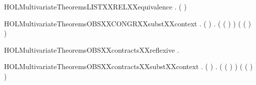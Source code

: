 \newcommand{\HOLMultivariateTheoremsFVXXSUBSETXXBIGUNIONXXPRO}{\UseVerbatim{HOLMultivariateTheoremsFVXXSUBSETXXBIGUNIONXXPRO}}
\begin{SaveVerbatim}{HOLMultivariateTheoremsLISTXXRELXXequivalence}
\HOLTokenTurnstile{} \HOLSymConst{\HOLTokenForall{}}.   \HOLSymConst{\HOLTokenImp{}}  ( )
\end{SaveVerbatim}
\newcommand{\HOLMultivariateTheoremsLISTXXRELXXequivalence}{\UseVerbatim{HOLMultivariateTheoremsLISTXXRELXXequivalence}}
\begin{SaveVerbatim}{HOLMultivariateTheoremsOBSXXCONGRXXsubstXXcontext}
\HOLTokenTurnstile{} \HOLSymConst{\HOLTokenForall{}}  .
         \HOLSymConst{\HOLTokenConj{}} (  \HOLSymConst{=}  ) \HOLSymConst{\HOLTokenConj{}}
          \HOLSymConst{\HOLTokenImp{}}
       \HOLSymConst{\HOLTokenForall{}}.
              \HOLSymConst{\HOLTokenImp{}}
            ( ( \HOLSymConst{\HOLTokenMapto{}} ) )
             ( ( \HOLSymConst{\HOLTokenMapto{}} ) )
\end{SaveVerbatim}
\newcommand{\HOLMultivariateTheoremsOBSXXCONGRXXsubstXXcontext}{\UseVerbatim{HOLMultivariateTheoremsOBSXXCONGRXXsubstXXcontext}}
\begin{SaveVerbatim}{HOLMultivariateTheoremsOBSXXcontractsXXreflexive}
\HOLTokenTurnstile{} \HOLSymConst{\HOLTokenForall{}}.   
\end{SaveVerbatim}
\newcommand{\HOLMultivariateTheoremsOBSXXcontractsXXreflexive}{\UseVerbatim{HOLMultivariateTheoremsOBSXXcontractsXXreflexive}}
\begin{SaveVerbatim}{HOLMultivariateTheoremsOBSXXcontractsXXsubstXXcontext}
\HOLTokenTurnstile{} \HOLSymConst{\HOLTokenForall{}}  .
         \HOLSymConst{\HOLTokenConj{}} (  \HOLSymConst{=}  ) \HOLSymConst{\HOLTokenConj{}}
          \HOLSymConst{\HOLTokenImp{}}
       \HOLSymConst{\HOLTokenForall{}}.
              \HOLSymConst{\HOLTokenImp{}}
            ( ( \HOLSymConst{\HOLTokenMapto{}} ) )
             ( ( \HOLSymConst{\HOLTokenMapto{}} ) )
\end{SaveVerbatim}
